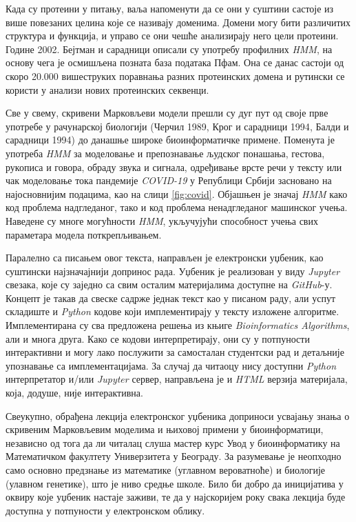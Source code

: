 \documentclass[12pt,oneside]{memoir}
\begin{document}
\begin{CJK}{UTF8}{ipxm}
Када су протеини у питању, ваља напоменути да се они у суштини састоје из више повезаних целина које се називају доменима. Домени могу бити различитих структура и функција, и управо се они чешће анализирају него цели протеини. Године 2002. Бејтман и сарадници описали су употребу профилних \textit{HMM}, на основу чега је осмишљена позната база података Пфам\cite{bateman2002}. Она се данас састоји од скоро 20.000 вишеструких поравнања разних протеинских домена и рутински се користи у анализи нових протеинских секвенци\cite{pfam}.

Све у свему, скривени Марковљеви модели прешли су дуг пут од своје прве употребе у рачунарској биологији (Черчил 1989\cite{churchill1989}, Крог и сарадници 1994\cite{krogh1994}, Балди и сарадници 1994\cite{baldi1994}) до данашње широке биоинформатичке примене. Поменута је употреба \textit{HMM} за моделовање и препознавање људског понашања, гестова, рукописа и говора, обраду звука и сигнала, одређивање врсте речи у тексту или чак моделовање тока пандемије \textit{COVID-19} у Републици Србији засновано на најосновнијим подацима, као на слици \ref{fig:covid}. Објашњен је значај \textit{HMM} како код проблема надгледаног, тако и код проблема ненадгледаног машинског учења. Наведене су многе могућности \textit{HMM}, укључујући способност учења свих параметара модела поткрепљивањем.

Паралелно са писањем овог текста, направљен је електронски уџбеник, као суштински најзначајнији допринос рада. Уџбеник је реализован у виду \textit{Jupyter} свезака, које су заједно са свим осталим материјалима доступне на \textit{GitHub}-у\cite{vasovich2021}. Концепт је такав да свеске садрже једнак текст као у писаном раду, али успут складиште и \textit{Python} кодове који имплементирају у тексту изложене алгоритме. Имплементирана су сва предложена решења из књиге \textit{Bioinformatics Algorithms}, али и многа друга. Како се кодови интерпретирају, они су у потпуности интерактивни и могу лако послужити за самосталан студентски рад и детаљније упознавање са имплементацијама. За случај да читаоцу нису доступни \textit{Python} интерпретатор и/или \textit{Jupyter} сервер, направљена је и \textit{HTML} верзија материјала, која, додуше, није интерактивна.

Свеукупно, обрађена лекција електронског уџбеника доприноси усвајању знања о скривеним Марковљевим моделима и њиховој примени у биоинформатици, независно од тога да ли читалац слуша мастер курс Увод у биоинформатику на Математичком факултету Универзитета у Београду. За разумевање је неопходно само основно предзнање из математике (углавном вероватноће) и биологије (улавном генетике), што је ниво средње школе. Било би добро да иницијатива у оквиру које уџбеник настаје заживи, те да у најскоријем року свака лекција буде доступна у потпуности у електронском облику.

\literatura

\end{CJK}
\end{document}
